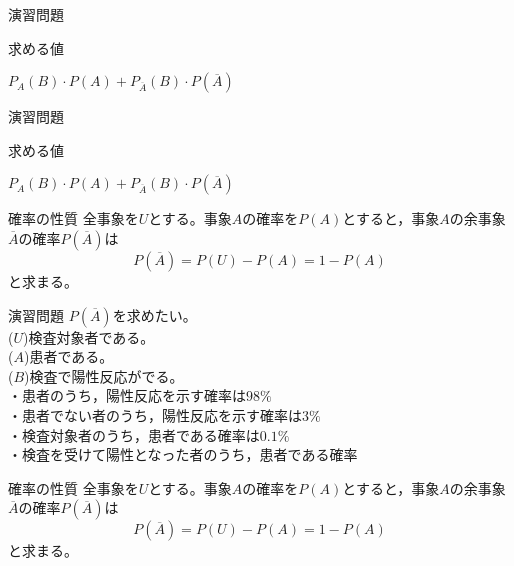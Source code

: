 \documentclass[aspectratio=169, dvipdfmx, 11pt]{beamer}
\begin{document}
\begin{frame}{演習問題}

\begin{alertblock}{求める値}
\begin{center}
$P_A(B)\cdot P(A)+P_{\overline{A}}(B)\cdot P(\overline{A})$
\end{center}
\end{alertblock}

\end{frame}


\begin{frame}{演習問題}

\begin{alertblock}{求める値}
\begin{center}
$P_A(B)\cdot P(A)+P_{\overline{A}}(B)\cdot P(\overline{A})$
\end{center}
\end{alertblock}

\begin{block}{確率の性質}
全事象を$U$とする。事象$A$の確率を$P(A)$とすると，事象$A$の余事象$\overline{A}$の確率$P(\overline{A})$は
\begin{equation}
P(\overline{A})=P(U)-P(A)=1-P(A)
\end{equation}
と求まる。
\end{block}

\end{frame}


\begin{frame}{演習問題}
$P(\overline{A})$を求めたい。\\
($U$)検査対象者である。\\
($A$)患者である。\\
($B$)検査で陽性反応がでる。\\

・患者のうち，陽性反応を示す確率は$98\%$\\
・患者でない者のうち，陽性反応を示す確率は$3\%$\\
・検査対象者のうち，患者である確率は$0.1\%$\\
・検査を受けて陽性となった者のうち，患者である確率

\begin{block}{確率の性質}
全事象を$U$とする。事象$A$の確率を$P(A)$とすると，事象$A$の余事象$\overline{A}$の確率$P(\overline{A})$は
\begin{equation}
P(\overline{A})=P(U)-P(A)=1-P(A)
\end{equation}
と求まる。
\end{block}
\end{frame}
\end{document}
